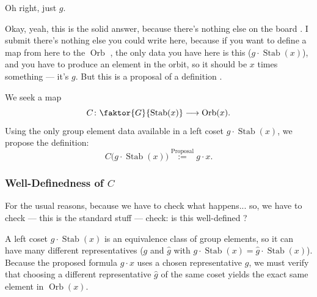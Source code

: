\begin{student}
Oh right, just $g$.
\end{student}

\begin{speech}[00:25:59 - 00:26:28]
Okay, yeah, this is the solid answer, because there's nothing else on the board . I submit there's nothing else you could write here, because if you want to define a map from here  to the $\operatorname{Orb}$ , the only data you have here is this ($g \cdot \operatorname{Stab}(x)$), and you have to produce an element in the orbit, so it should be $x$ times something --- it's $g$. But this is a proposal of a definition .
\end{speech}

\begin{content}
We seek a map
\[
C \colon \faktor{G}{\operatorname{Stab}(x)} \longrightarrow \operatorname{Orb}(x).
\]
Using the only group element data available in a left coset $g \cdot \operatorname{Stab}(x)$, we propose the definition:
\[
C\bigl(g \cdot \operatorname{Stab}(x)\bigr) \stackrel{\text{Proposal}}{:=} g \cdot x.
\]
\end{content}

\subsubsection{Well-Definedness of \texorpdfstring{$C$}{C}}

\begin{speech}[00:26:28 - 00:26:42]
For the usual reasons, because we have to check what happens... so, we have to check --- this is the standard stuff --- check: is this well-defined ?
\end{speech}

\begin{content}

\begin{steps}
A left coset $g \cdot \operatorname{Stab}(x)$ is an equivalence class of group elements, so it can have many different representatives ($g$ and $\hat{g}$ with $g \cdot \operatorname{Stab}(x) = \hat{g} \cdot \operatorname{Stab}(x)$). Because the proposed formula $g \cdot x$ uses a chosen representative $g$, we must verify that choosing a different representative $\hat{g}$ of the same coset yields the exact same element in $\operatorname{Orb}(x)$.
\end{steps}
\end{content}

